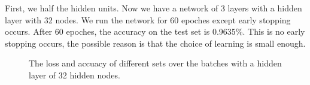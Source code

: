 \documentclass{article} %
\begin{document}
First, we half the hidden units. Now we have a network of 3 layers with a hidden layer with 32 nodes. We run the network for 60 epoches except early stopping occurs. After 60 epoches, the accuracy on the test set is 0.9635\%. This is no early stopping occurs, the possible reason is that the choice of learning is small enough.

\begin{figure} [!htbp]
	
	\caption{The loss and accuacy of different sets over the batches with a hidden layer of 32 hidden nodes. }  
	
\end{figure}
\end{document}
